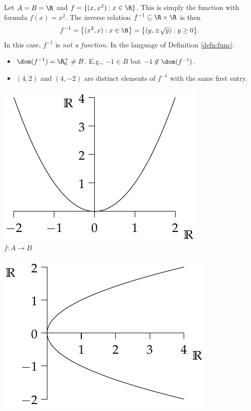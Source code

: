 \begin{examples}
\item\label{ex:reln1} Let $A=B=\R$ and $f=\{(x,x^2):x\in\R\}$. This is simply the function with formula $f(x)=x^2$. The inverse relation $f^{-1}\subseteq\R\times\R$ is then
\[f^{-1}=\bigl\{(x^2,x):x\in\R\bigr\}=\bigl\{(y,\pm\sqrt y):y\ge 0\bigr\}.\]
In this case, $f^{-1}$ is \emph{not a function.} In the language of Definition \ref{defn:func}:
\begin{itemize}
  \item $\dom(f^{-1})=\R^+_0\neq B$. E.g., $-1\in B$ but $-1\not\in\dom(f^{-1})$.
  \item $(4,2)$ and $(4,-2)$ are distinct elements of $f^{-1}$ with the same first entry.
\end{itemize}
\begin{center}
\begin{minipage}{0.35\textwidth}\centering
\includegraphics[width=\textwidth]{relations-20-reln2}\\
$f:A\to B$
\end{minipage}\qquad\qquad\qquad
\begin{minipage}{0.35\textwidth}\centering
\includegraphics[width=\textwidth]{relations-21-reln2}\\

\end{minipage}
\end{center}
\end{examples}
